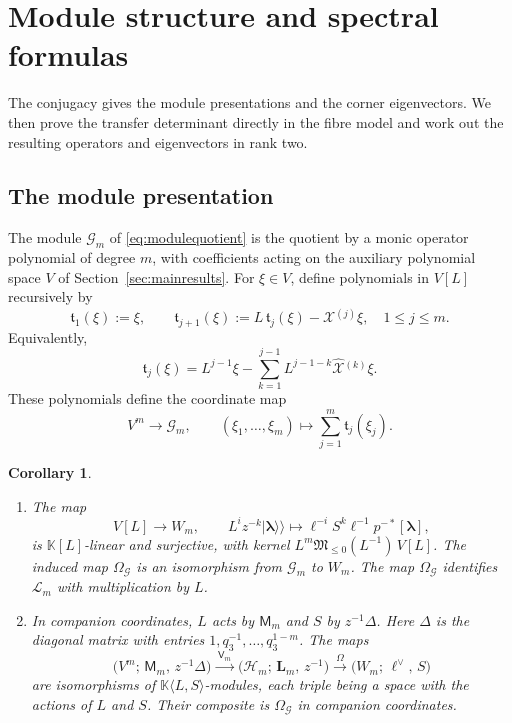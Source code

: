 \documentclass[11pt]{amsart}
\newtheorem{corollary}[theorem]{Corollary}
\theoremstyle{definition}
\theoremstyle{remark}
\newcommand{\K}{\mathbb K}                       %
\newcommand{\bl}{{\boldsymbol{\lambda}}}         %
\newcommand{\Wsp}[1]{W_{#1}}                     %
\newcommand{\HH}{\mathcal H}
\newcommand{\Hsp}[1]{\HH_{#1}}                   %
\newcommand{\kket}[1]{\lvert #1\rangle\!\rangle} %
\newcommand{\fix}[1]{[#1]}                       %
\newcommand{\taut}{\ell}                         %
\newcommand{\dtaut}{\taut^{\vee}}                %
\newcommand{\pulm}{p^{-*}}                       %
\newcommand{\Shift}{S}                           %
\newcommand{\Omap}{\Omega}                       %
\newcommand{\OmapG}{\Omega_{\mathcal G}}         %
\newcommand{\Llet}{L}                            %
\newcommand{\Gmod}[1]{\mathcal G_{#1}}           %
\newcommand{\Trunc}[1]{\mathfrak t_{#1}}         %
\newcommand{\LL}{\mathbf L}
\newcommand{\Lax}[1]{\LL_{#1}}                   %
\newcommand{\GLax}[1]{\mathcal L_{#1}}           %
\newcommand{\Xhat}[1]{\widehat{\mathcal X}{}^{(#1)}}   %
\newcommand{\MM}{\mathsf M}
\newcommand{\Miura}[1]{\MM_{#1}}                 %
\newcommand{\VV}{\mathsf V}
\newcommand{\Vconj}[1]{\VV_{#1}}                 %
\newcommand{\Miuraop}{\mathfrak M}               %
\newcommand{\Miuraproj}{\Miuraop_{\leq0}}         %
\begin{document}
\section{Module structure and spectral formulas}\label{sec:consequences}

The conjugacy gives the module presentations and the corner eigenvectors.
We then prove the transfer determinant directly in the fibre model and work out
the resulting operators and eigenvectors in rank two.

\subsection{The module presentation}\label{sec:structure}

The module \(\Gmod{m}\) of \eqref{eq:modulequotient} is the quotient by a monic
operator polynomial of degree \(m\), with coefficients acting on the auxiliary
polynomial space \(V\) of Section~\ref{sec:mainresults}.
For \(\xi\in V\), define polynomials in \(V[\Llet]\) recursively by
\[
 \Trunc{1}(\xi):=\xi,\qquad
 \Trunc{j+1}(\xi):=\Llet\,\Trunc{j}(\xi)-\Xhat{j}\xi,\quad1\leq j\leq m.
\]
Equivalently,
\[
 \Trunc{j}(\xi)=\Llet^{j-1}\xi-\sum_{k=1}^{j-1}\Llet^{j-1-k}\Xhat{k}\xi.
\]
These polynomials define the coordinate map
\[
 V^m\longrightarrow\Gmod{m},\qquad
 (\xi_1,\dots,\xi_m)\longmapsto\sum_{j=1}^m\Trunc{j}(\xi_j).
\]

\begin{corollary}\label{cor:structure}
\begin{enumerate}
\item[(i)] The map
\[
 V[\Llet]\to\Wsp{m},\qquad
 \Llet^iz^{-k}\kket{\bl}\longmapsto\taut^{-i}\Shift^k\taut^{-1}\pulm\fix{\bl},
\]
is \(\K[\Llet]\)-linear and surjective, with kernel
\(\Llet^m\Miuraproj(\Llet^{-1})\,V[\Llet]\).
The induced map \(\OmapG\) is an isomorphism from \(\Gmod{m}\) to
\(\Wsp{m}\). The map \(\OmapG\) identifies \(\GLax{m}\) with multiplication by \(\Llet\).
\item[(ii)] In companion coordinates, \(\Llet\) acts by \(\Miura{m}\) and
\(\Shift\) by \(z^{-1}\Delta\). Here \(\Delta\) is the diagonal matrix with
entries \(1,q_3^{-1},\dots,q_3^{1-m}\).
The maps
\[
 \bigl(V^m;\,\Miura{m},\,z^{-1}\Delta\bigr)\xrightarrow{\;\Vconj{m}\;}
 \bigl(\Hsp{m};\,\Lax{m},\,z^{-1}\bigr)\xrightarrow{\;\Omap\;}
 \bigl(\Wsp{m};\,\dtaut,\,\Shift\bigr)
\]
are isomorphisms of \(\K\langle\Llet,\Shift\rangle\)-modules, each triple
being a space with the actions of \(\Llet\) and \(\Shift\).
Their composite is \(\OmapG\) in companion coordinates.
\end{enumerate}
\end{corollary}
\end{document}
